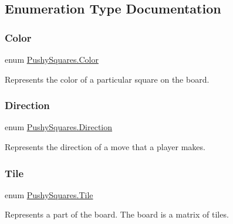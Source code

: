 \subsection{Enumeration Type Documentation}
\mbox{\label{namespace_pushy_squares_a456c990da0c8e2089c171d31f7e27574}} 
\subsubsection{\texorpdfstring{Color}{Color}}
{\footnotesize\ttfamily enum \hyperlink{namespace_pushy_squares_a456c990da0c8e2089c171d31f7e27574}{Pushy\+Squares.\+Color}\hspace{0.3cm}{\ttfamily [strong]}}



Represents the color of a particular square on the board. 

\mbox{\label{namespace_pushy_squares_acc0b0bbd9a5171048a288222e2a4d00b}} 
\subsubsection{\texorpdfstring{Direction}{Direction}}
{\footnotesize\ttfamily enum \hyperlink{namespace_pushy_squares_acc0b0bbd9a5171048a288222e2a4d00b}{Pushy\+Squares.\+Direction}\hspace{0.3cm}{\ttfamily [strong]}}



Represents the direction of a move that a player makes. 

\mbox{\label{namespace_pushy_squares_a99b558ed55fb7c5c20e9fe37c652132c}} 
\subsubsection{\texorpdfstring{Tile}{Tile}}
{\footnotesize\ttfamily enum \hyperlink{namespace_pushy_squares_a99b558ed55fb7c5c20e9fe37c652132c}{Pushy\+Squares.\+Tile}\hspace{0.3cm}{\ttfamily [strong]}}



Represents a part of the board. The board is a matrix of tiles. 

